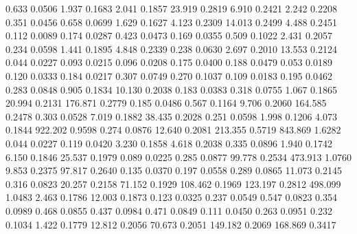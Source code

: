 0.633    0.0506 %
1.937    0.1683 %
2.041    0.1857 %
23.919   0.2819 %
6.910    0.2421 %
2.242    0.2208 %
0.351    0.0456 %
0.658    0.0699 %
1.629    0.1627 %
4.123    0.2309 %
14.013   0.2499 %
4.488    0.2451 %
0.112    0.0089 %
0.174    0.0287 %
0.423    0.0473 %
0.169    0.0355 %
0.509    0.1022 %
2.431    0.2057 %
0.234    0.0598 %
1.441    0.1895 %
4.848    0.2339 %
0.238    0.0630 %
2.697    0.2010 %
13.553   0.2124 %
0.044    0.0227 %
0.093    0.0215 %
0.096    0.0208 %
0.175    0.0400 %
0.188    0.0479 %
0.053    0.0189 %
0.120    0.0333 %
0.184    0.0217 %
0.307    0.0749 %
0.270    0.1037 %
0.109    0.0183 %
0.195    0.0462 %
0.283    0.0848 %
0.905    0.1834 %
10.130   0.2038 %
0.183    0.0383 %
0.318    0.0755 %
1.067    0.1865 %
20.994   0.2131 %
176.871  0.2779 %
0.185    0.0486 %
0.567    0.1164 %
9.706    0.2060 %
164.585  0.2478 %
0.303    0.0528 %
7.019    0.1882 %
38.435   0.2028 %
0.251    0.0598 %
1.998    0.1206 %
4.073    0.1844 %
922.202  0.9598 %
0.274    0.0876 %
12.640   0.2081 %
213.355  0.5719 %
843.869  1.6282 %
0.044    0.0227 %
0.119    0.0420 %
3.230    0.1858 %
4.618    0.2038 %
0.335    0.0896 %
1.940    0.1742 %
6.150    0.1846 %
25.537   0.1979 %
0.089    0.0225 %
0.285    0.0877 %
99.778   0.2534 %
473.913  1.0760 %
9.853    0.2375 %
97.817   0.2640 %
0.135    0.0370 %
0.197    0.0558 %
0.289    0.0865 %
11.073   0.2145 %
0.316    0.0823 %
20.257   0.2158 %
71.152   0.1929 %
108.462  0.1969 %
123.197  0.2812 %
498.099  1.0483 %
2.463    0.1786 %
12.003   0.1873 %
0.123    0.0325 %
0.237    0.0549 %
0.547    0.0823 %
0.354    0.0989 %
0.468    0.0855 %
0.437    0.0984 %
0.471    0.0849 %
0.111    0.0450 %
0.263    0.0951 %
0.232    0.1034 %
1.422    0.1779 %
12.812   0.2056 %
70.673   0.2051 %
149.182  0.2069 %
168.869  0.3417 %
